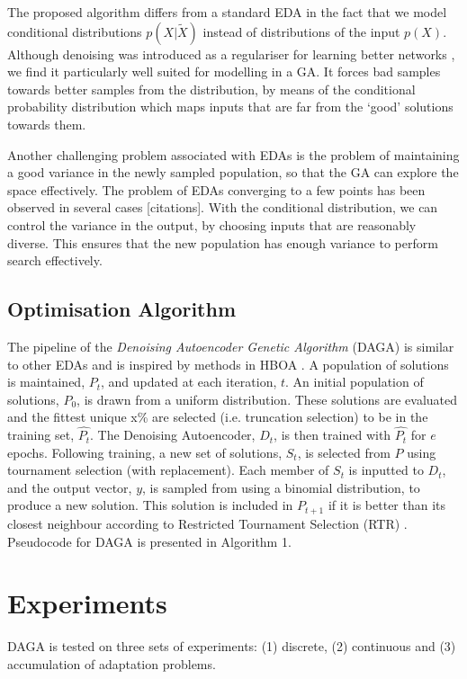\documentclass[runningheads,a4paper]{llncs}
\begin{document}
The proposed algorithm differs from a standard EDA in the fact that we model conditional distributions $p(X|\tilde X)$ instead of distributions of the input $p(X)$. Although denoising was introduced as a regulariser for learning better networks \cite{vincent2010stacked}, we find it particularly well suited for modelling in a GA. It forces bad samples towards better samples from the distribution, by means of the conditional probability distribution which maps inputs that are far from the `good' solutions towards them.

Another challenging problem associated with EDAs is the problem of maintaining a good variance in the newly sampled population, so that the GA can explore the space effectively. The problem of EDAs converging to a few points has been observed in several cases [citations]. With the conditional distribution, we can control the variance in the output, by choosing inputs that are reasonably diverse. This ensures that the new population has enough variance to perform search effectively. 



\subsection{Optimisation Algorithm}

The pipeline of the \emph{Denoising Autoencoder Genetic Algorithm} (DAGA) is similar to other EDAs and is inspired by methods in HBOA \cite{hboa}. A population of solutions is maintained, \(P_t\), and updated at each iteration, \(t\). An initial population of solutions, \(P_0\), is drawn from a uniform distribution. These solutions are evaluated and the fittest unique x\% are selected (i.e. truncation selection) to be in the training set, \(\hat{P_t}\). The Denoising Autoencoder, \(D_t\), is then trained with \(\hat{P_t}\) for \(e\) epochs. Following training, a new set of solutions, \(S_t\), is selected from \(P\) using tournament selection (with replacement). Each member of \(S_t\) is inputted to \(D_t\), and the output vector, \(y\), is sampled from using a binomial distribution, to produce a new solution. This solution is included in \(P_{t+1}\) if it is better than its closest neighbour according to Restricted Tournament Selection (RTR) \cite{hboa}. Pseudocode for DAGA is presented in Algorithm 1.

\section{Experiments}
\label{sec:experiments}
DAGA is tested on three sets of experiments: (1) discrete, (2) continuous and (3) accumulation of adaptation problems. 
\end{document}
